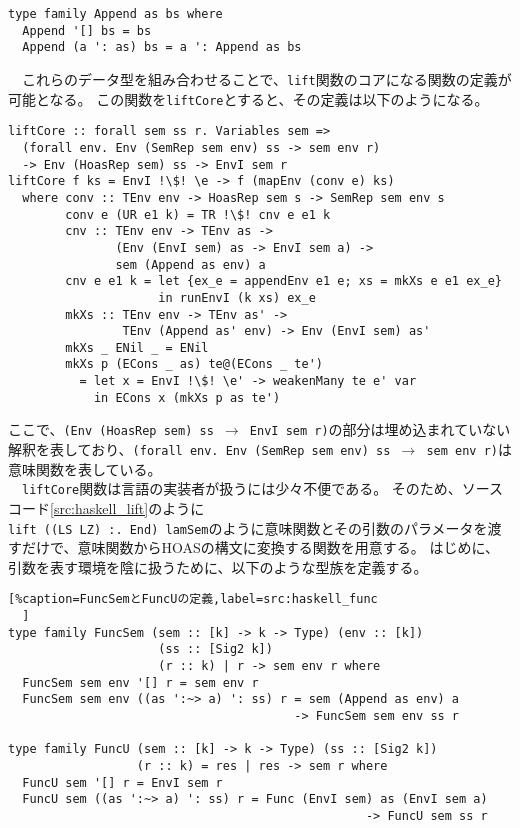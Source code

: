 \documentclass[uplatex]{sumiilab-paper}
\theoremstyle{mystyle}
\numberwithin{definition}{chapter} %
\begin{document}
\begin{lstlisting}[caption=Appendの定義,label=src:haskell_append]
type family Append as bs where
  Append '[] bs = bs
  Append (a ': as) bs = a ': Append as bs
\end{lstlisting}

　これらのデータ型を組み合わせることで、{\tt lift}関数のコアになる関数の定義が可能となる。
この関数を{\tt liftCore}とすると、その定義は以下のようになる。

\begin{lstlisting}[caption=liftCoreの定義,label=src:haskell_liftCore,escapechar=!]
liftCore :: forall sem ss r. Variables sem =>
  (forall env. Env (SemRep sem env) ss -> sem env r)
  -> Env (HoasRep sem) ss -> EnvI sem r
liftCore f ks = EnvI !\$! \e -> f (mapEnv (conv e) ks)
  where conv :: TEnv env -> HoasRep sem s -> SemRep sem env s
        conv e (UR e1 k) = TR !\$! cnv e e1 k 
        cnv :: TEnv env -> TEnv as -> 
               (Env (EnvI sem) as -> EnvI sem a) -> 
               sem (Append as env) a
        cnv e e1 k = let {ex_e = appendEnv e1 e; xs = mkXs e e1 ex_e}
                     in runEnvI (k xs) ex_e
        mkXs :: TEnv env -> TEnv as' -> 
                TEnv (Append as' env) -> Env (EnvI sem) as'
        mkXs _ ENil _ = ENil
        mkXs p (ECons _ as) te@(ECons _ te')
          = let x = EnvI !\$! \e' -> weakenMany te e' var
            in ECons x (mkXs p as te')
\end{lstlisting}

ここで、{\tt (Env (HoasRep sem) ss $\rightarrow$ EnvI sem r)}の部分は埋め込まれていない解釈を表しており、{\tt (forall env. Env (SemRep sem env) ss $\rightarrow$ sem env r)}は意味関数を表している。\\
　{\tt liftCore}関数は言語の実装者が扱うには少々不便である。
そのため、ソースコード\ref{src:haskell_lift}のように\\
{\tt lift ((LS LZ) :. End) lamSem}のように意味関数とその引数のパラメータを渡すだけで、意味関数からHOASの構文に変換する関数を用意する。
はじめに、引数を表す環境を陰に扱うために、以下のような型族を定義する。

\begin{lstlisting}[%caption=FuncSemとFuncUの定義,label=src:haskell_func
  ]
type family FuncSem (sem :: [k] -> k -> Type) (env :: [k])
                     (ss :: [Sig2 k]) 
                     (r :: k) | r -> sem env r where
  FuncSem sem env '[] r = sem env r
  FuncSem sem env ((as ':~> a) ': ss) r = sem (Append as env) a
                                        -> FuncSem sem env ss r

type family FuncU (sem :: [k] -> k -> Type) (ss :: [Sig2 k])
                  (r :: k) = res | res -> sem r where
  FuncU sem '[] r = EnvI sem r
  FuncU sem ((as ':~> a) ': ss) r = Func (EnvI sem) as (EnvI sem a)
                                                  -> FuncU sem ss r
\end{lstlisting}
\end{document}
